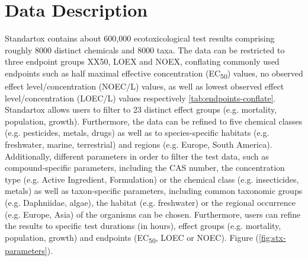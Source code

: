 \section{Data Description}

Standartox contains about 600,000 ecotoxicological test results comprising roughly 8000 distinct chemicals and 8000 taxa. The data can be restricted to three endpoint groups XX50, LOEX and NOEX, conflating commonly used endpoints such as half maximal effective concentration (EC\textsubscript{50}) values, no observed effect level/concentration (NOEC/L) values, as well as lowest observed effect level/concentration (LOEC/L) values respectively \ref{tab:endpoints-conflate}. Standartox allows users to filter to 23 distinct effect groups (e.g. mortality, population, growth). Furthermore, the data can be refined to five chemical classes (e.g. pesticides, metals, drugs) as well as to species-specific habitats (e.g. freshwater, marine, terrestrial) and regions (e.g. Europe, South America). Additionally, different parameters in order to filter the test data, such as compound-specific parameters, including the CAS number, the concentration type (e.g. Active Ingredient, Formulation) or the chemical class (e.g. insecticides, metals) as well as taxon-specific parameters, including common taxonomic groups (e.g. Daphniidae, algae), the habitat (e.g. freshwater) or the regional occurrence (e.g. Europe, Asia) of the organisms can be chosen. Furthermore, users can refine the results to specific test durations (in hours), effect groups (e.g. mortality, population, growth) and endpoints (EC\textsubscript{50}, LOEC or NOEC). Figure (\ref{fig:stx-parameters}).

